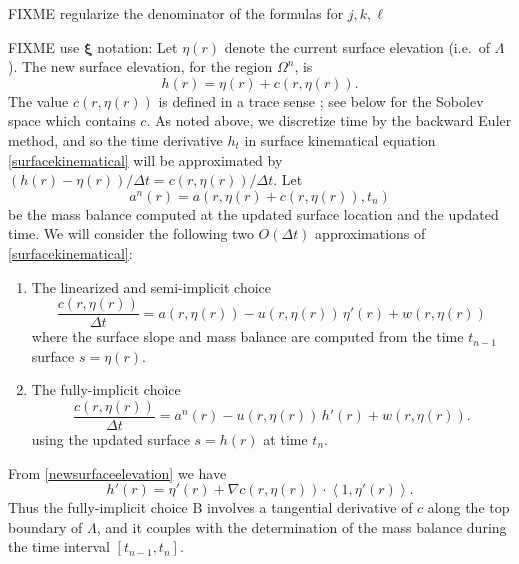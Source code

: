 \documentclass[letterpaper,final,12pt,reqno]{amsart}
\newcommand{\grad}{\nabla}
\newcommand{\bxi}{\bm{\xi}}
\begin{document}
FIXME regularize the denominator of the formulas for $j,k,\ell$

FIXME use $\bxi$ notation: Let $\eta(r)$ denote the current surface elevation (i.e.~of $\Lambda$).  The new surface elevation, for the region $\Omega^n$, is
\begin{equation}
h(r) = \eta(r) + c(r,\eta(r)).  \label{newsurfaceelevation}
\end{equation}
The value $c(r,\eta(r))$ is defined in a trace sense \cite{Evans2010}; see below for the Sobolev space which contains $c$.  As noted above, we discretize time by the backward Euler method, and so the time derivative $h_t$ in surface kinematical equation \eqref{surfacekinematical} will be approximated by $(h(r) - \eta(r))/\Delta t = c(r,\eta(r))/\Delta t$.  Let
\begin{equation}
a^n(r) = a\left(r,\eta(r) + c(r,\eta(r)),t_n\right) \label{massbalance}
\end{equation}
be the mass balance computed at the updated surface location and the updated time.  We will consider the following two $O(\Delta t)$ approximations of \eqref{surfacekinematical}:
\renewcommand{\labelenumi}{\Alph{enumi}.}
\begin{enumerate}
\item The linearized and semi-implicit choice
\begin{equation}
\frac{c(r,\eta(r))}{\Delta t} = a(r,\eta(r)) - u(r,\eta(r))\,\eta'(r) + w(r,\eta(r)) \label{surfacesemiimplicit}
\end{equation}
where the surface slope and mass balance are computed from the time $t_{n-1}$ surface $s=\eta(r)$.
\item The fully-implicit choice
\begin{equation}
\frac{c(r,\eta(r))}{\Delta t} = a^n(r) - u(r,\eta(r))\,h'(r) + w(r,\eta(r)). \label{surfaceimplicit}
\end{equation}
using the updated surface $s=h(r)$ at time $t_n$.
\end{enumerate}
From \eqref{newsurfaceelevation} we have
    $$h'(r) = \eta'(r) + \grad c (r,\eta(r)) \cdot \left<1,\eta'(r)\right>.$$
Thus the fully-implicit choice B involves a tangential derivative of $c$ along the top boundary of $\Lambda$, and it couples with the determination of the mass balance during the time interval $[t_{n-1},t_n]$.
\end{document}

